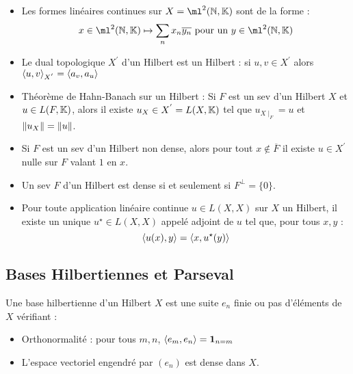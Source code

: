 \documentclass{cours}
\begin{document}
\begin{remark}
    \begin{itemize}
        \item Les formes linéaires continues sur $X = \ml^{2}(\N, \K)$ sont de la forme :
              \[
                  x \in \ml^{2}(\N, \K) \mapsto \sum_{n} x_{n}\overline{y_{n}} \text{ pour un } y \in \ml^{2}(\N, \K)
              \]
        \item Le dual topologique $X^{'}$ d'un Hilbert est un Hilbert : si $u, v \in X^{'}$ alors $\left\langle u, v \right\rangle_{X^{'}} = \left\langle a_{v}, a_{u} \right\rangle$
        \item Théorème de Hahn-Banach sur un Hilbert : Si $F$ est un sev d'un Hilbert $X$ et $u \in L(F, \mathbb{K})$, alors il existe $u_{X} \in X^{'} = L(X, \mathbb{K})$ tel que $u_{X \mid_{F}} = u$ et $\left\lVert u_{X} \right\rVert = \left\lVert u \right\rVert$.
        \item Si $F$ est un sev d'un Hilbert non dense, alors pour tout $x \notin \overline{F}$ il existe $u \in X^{'}$ nulle sur $F$ valant $1$ en $x$.
        \item Un sev $F$ d'un Hilbert est dense si et seulement si $F^{\perp}= \{0\}$.
        \item Pour toute application linéaire continue $u \in L(X, X)$ sur $X$ un Hilbert, il existe un unique $u^{\star} \in L(X, X)$ appelé adjoint de $u$ tel que, pour tous $x, y$ :
              \[
                  \left\langle u(x), y \right\rangle = \left\langle x, u^{\star}(y) \right\rangle
              \]
    \end{itemize}
\end{remark}

\subsection{Bases Hilbertiennes et Parseval}
\begin{definition}
    Une base hilbertienne d'un Hilbert $X$ est une suite $e_{n}$ finie ou pas d'éléments de $X$ vérifiant :
    \begin{itemize}
        \item Orthonormalité : pour tous $m, n$, $\left\langle e_{m}, e_{n} \right\rangle = \mathbf{1}_{n = m}$
        \item L'espace vectoriel engendré par $(e_{n})$ est dense dans $X$.
    \end{itemize}
\end{definition}
\end{document}
